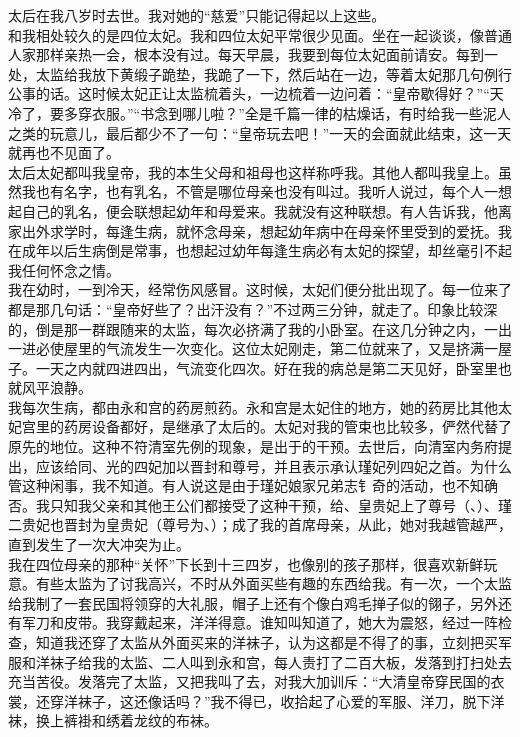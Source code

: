 太后在我八岁时去世。我对她的“慈爱”只能记得起以上这些。\\

和我相处较久的是四位太妃。我和四位太妃平常很少见面。坐在一起谈谈，像普通人家那样亲热一会，根本没有过。每天早晨，我要到每位太妃面前请安。每到一处，太监给我放下黄缎子跪垫，我跪了一下，然后站在一边，等着太妃那几句例行公事的话。这时候太妃正让太监梳着头，一边梳着一边问着：“皇帝歇得好？”“天冷了，要多穿衣服。”“书念到哪儿啦？”全是千篇一律的枯燥话，有时给我一些泥人之类的玩意儿，最后都少不了一句：“皇帝玩去吧！”一天的会面就此结束，这一天就再也不见面了。\\

太后太妃都叫我皇帝，我的本生父母和祖母也这样称呼我。其他人都叫我皇上。虽然我也有名字，也有乳名，不管是哪位母亲也没有叫过。我听人说过，每个人一想起自己的乳名，便会联想起幼年和母爱来。我就没有这种联想。有人告诉我，他离家出外求学时，每逢生病，就怀念母亲，想起幼年病中在母亲怀里受到的爱抚。我在成年以后生病倒是常事，也想起过幼年每逢生病必有太妃的探望，却丝毫引不起我任何怀念之情。\\

我在幼时，一到冷天，经常伤风感冒。这时候，太妃们便分批出现了。每一位来了都是那几句话：“皇帝好些了？出汗没有？”不过两三分钟，就走了。印象比较深的，倒是那一群跟随来的太监，每次必挤满了我的小卧室。在这几分钟之内，一出一进必使屋里的气流发生一次变化。这位太妃刚走，第二位就来了，又是挤满一屋子。一天之内就四进四出，气流变化四次。好在我的病总是第二天见好，卧室里也就风平浪静。\\

我每次生病，都由永和宫的药房煎药。永和宫是太妃住的地方，她的药房比其他太妃宫里的药房设备都好，是继承了太后的。太妃对我的管束也比较多，俨然代替了原先的地位。这种不符清室先例的现象，是出于的干预。去世后，向清室内务府提出，应该给同、光的四妃加以晋封和尊号，并且表示承认瑾妃列四妃之首。为什么管这种闲事，我不知道。有人说这是由于瑾妃娘家兄弟志钅奇的活动，也不知确否。我只知我父亲和其他王公们都接受了这种干预，给、皇贵妃上了尊号（、）、瑾二贵妃也晋封为皇贵妃（尊号为、）；成了我的首席母亲，从此，她对我越管越严，直到发生了一次大冲突为止。\\

我在四位母亲的那种“关怀”下长到十三四岁，也像别的孩子那样，很喜欢新鲜玩意。有些太监为了讨我高兴，不时从外面买些有趣的东西给我。有一次，一个太监给我制了一套民国将领穿的大礼服，帽子上还有个像白鸡毛掸子似的翎子，另外还有军刀和皮带。我穿戴起来，洋洋得意。谁知叫知道了，她大为震怒，经过一阵检查，知道我还穿了太监从外面买来的洋袜子，认为这都是不得了的事，立刻把买军服和洋袜子给我的太监、二人叫到永和宫，每人责打了二百大板，发落到打扫处去充当苦役。发落完了太监，又把我叫了去，对我大加训斥：“大清皇帝穿民国的衣裳，还穿洋袜子，这还像话吗？”我不得已，收拾起了心爱的军服、洋刀，脱下洋袜，换上裤褂和绣着龙纹的布袜。\\

